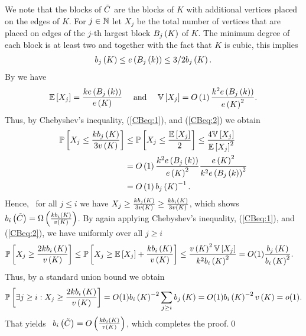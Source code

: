 We note that the blocks of $\tilde{C}$ are the blocks of $K$ with additional vertices placed on the edges of $K$. For $j\in \mathbb{N}$ let $X_j$ be the total number of vertices that are placed on edges of the $j$-th largest block $B_{j}\left(K\right)$ of $K$. The minimum degree of each block is at least two and together with the fact that $K$ is cubic, this implies
\begin{align}\label{CBeq:1}
b_{j}\left(K\right)\leq e\left({B_{j}\left(k\right)}\right)\leq 3/2b_{j}\left(K\right).
\end{align}
By  we have
\begin{align}\label{CBeq:2}
\mathbb{E}\left[X_j\right]=\frac{ke\left({B_{j}\left(k\right)}\right) }{e\left({K}\right)}\quad \text{ and }\quad \mathbb{V}\left[X_j\right]=O\left(1\right)\frac{k^2e\left({B_{j}\left(k\right)}\right) }{e\left({K}\right)^2}.
\end{align}
Thus, by Chebyshev's inequality, (\ref{CBeq:1}), and (\ref{CBeq:2}) we obtain
\begin{align*}
\mathbb{P}\left[X_j\leq \frac{k b_{j}\left(K\right)}{3v\left({K}\right)}\right]&\leq
\mathbb{P}\left[X_j\leq \frac{\mathbb{E}\left[X_j\right]}{2}\right]\leq \frac{4\mathbb{V}\left[X_j\right]}{\mathbb{E}\left[X_j\right]^2}
\\
&=O\left(1\right)\frac{k^2e\left({B_{j}\left(k\right)}\right) }{e\left({K}\right)^2}\frac{e\left({K}\right)^2}{k^2e\left({B_{j}\left(k\right)}\right)^2}
\\
&=O\left(1\right)b_{j}\left(K\right)^{-1}.
\end{align*} 
Hence, \whp\ for all $j\leq i$ we have $X_j\geq \frac{k b_{j}\left(K\right)}{3v\left({K}\right)}\geq \frac{k b_{i}\left(K\right)}{3v\left({K}\right)}$, which shows \whp\ $b_{i}\left(\tilde{C}\right)=\Omega\left(\frac{k b_{i}\left(K\right)}{v\left({K}\right)}\right)$. By again applying Chebyshev's inequality, (\ref{CBeq:1}), and (\ref{CBeq:2}), we have uniformly over all $j\geq i$ 
\begin{align*}
\mathbb{P}\left[X_j\geq \frac{2kb_{i}\left(K\right)}{v\left({K}\right)}\right]&\leq
\mathbb{P}\left[X_j\geq \mathbb{E}\left[X_j\right]+\frac{kb_{i}\left(K\right)}{v\left({K}\right)}\right]
\leq
\frac{v\left({K}\right)^2\mathbb{V}\left[X_j\right]}{k^2b_{i}\left(K\right)^2}
=O(1)\frac{b_{j}\left(K\right)}{b_{i}\left(K\right)^2}.
\end{align*}
Thus, by a standard union bound we obtain
\begin{align*}
\mathbb{P}\left[\exists j\geq i: X_j\geq \frac{2kb_{i}\left(K\right)}{v\left({K}\right)}\right]=O(1)b_{i}\left(K\right)^{-2}\sum_{j\geq i}b_{j}\left(K\right)=O(1)b_{i}\left(K\right)^{-2}v\left({K}\right)=o(1).
\end{align*}
That yields \whp\ $b_{i}\left(\tilde{C}\right)=O\left(\frac{k b_{i}\left(K\right)}{v\left({K}\right)}\right)$, which completes the proof.\qed

